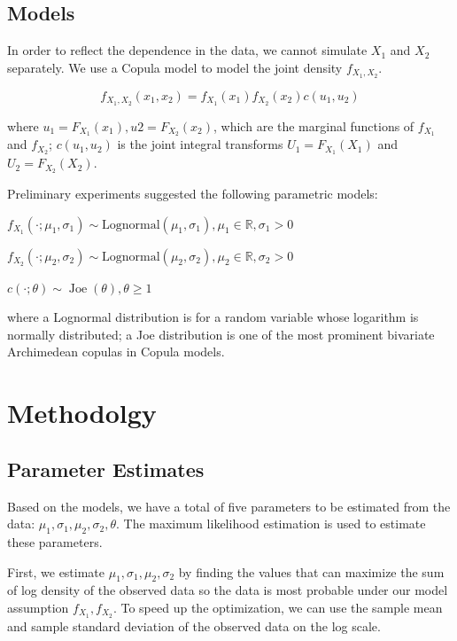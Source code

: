 \documentclass[11pt,]{article}
\begin{document}
\hypertarget{models}{%
\subsection{Models}\label{models}}

In order to reflect the dependence in the data, we cannot simulate
\(X_1\) and \(X_2\) separately. We use a Copula model to model the joint
density \(f_{X_{1}, X_{2}}\).

\[
f_{X_{1}, X_{2}}\left(x_{1}, x_{2}\right)=f_{X_{1}}\left(x_{1}\right) f_{X_{2}}\left(x_{2}\right) c\left(u_1,u_2\right)
\]

where
\(u_1 = F_{X_{1}}\left(x_{1}\right),u2= F_{X_{2}}\left(x_{2}\right)\),
which are the marginal functions of \(f_{X_{1}}\) and \(f_{X_{2}}\);
\(c\left(u_{1}, u_{2}\right)\) is the joint integral transforms
\(U_{1}=F_{X_{1}}\left(X_{1}\right)\) and
\(U_{2}=F_{X_{2}}\left(X_{2}\right)\).

Preliminary experiments suggested the following parametric models:

$f_{X_{1}}( \cdot  ; \mu_{1}, \sigma_{1})  \sim     \text{Lognormal} (\mu_{1}, \sigma_{1}), \mu_{1} \in \mathbb{R}, \sigma_{1}>0$

$f_{X_{2}}( \cdot ;  \mu_{2}, \sigma_{2})  \sim     \text{Lognormal} (\mu_{2}, \sigma_{2}), \mu_{2} \in \mathbb{R}, \sigma_{2}>0$

$c(\cdot ; \theta)   \sim      \operatorname{Joe}(\theta), \theta \geq 1$

where a Lognormal distribution is for a random variable whose logarithm
is normally distributed; a Joe distribution is one of the most prominent
bivariate Archimedean copulas in Copula models.

\hypertarget{methodolgy}{%
\section{Methodolgy}\label{methodolgy}}

\hypertarget{parameter-estimates}{%
\subsection{Parameter Estimates}\label{parameter-estimates}}

Based on the models, we have a total of five parameters to be estimated from the data: $\mu_{1}, \sigma_{1},\mu_{2},\sigma_{2},\theta $. The maximum likelihood estimation is used to estimate these parameters.

First, we estimate $\mu_{1}, \sigma_{1},\mu_{2},\sigma_{2}$ by finding the values that can maximize the sum of log density of the
observed data so the data is most probable under our model assumption
$f_{X_{1}}, f_{X_{2}}$. To speed up the optimization, we can use the
sample mean and sample standard deviation of the observed data on the
log scale.
\end{document}
